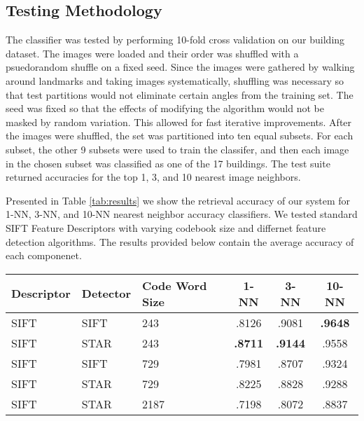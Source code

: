 \subsection{Testing Methodology}

The classifier was tested by performing 10-fold cross validation on our building dataset. 
The images were loaded and their order was shuffled with a psuedorandom shuffle on a fixed seed. 
Since the images were gathered by walking around landmarks and taking images systematically, shuffling was necessary so that test partitions would not eliminate certain angles from the training set. 
The seed was fixed so that the effects of modifying the algorithm would not be masked by random variation. This allowed for fast iterative improvements. After the images were shuffled, the set was partitioned into ten equal subsets. 
For each subset, the other 9 subsets were used to train the classifer, and then each image in the chosen subset was classified as one of the 17 buildings. 
The test suite returned accuracies for the top 1, 3, and 10 nearest image neighbors.


Presented in Table \ref{tab:results} we show the retrieval accuracy of our system for 1-NN, 3-NN, and 10-NN nearest neighbor accuracy classifiers.
We tested standard SIFT Feature Descriptors with varying codebook size and differnet feature detection algorithms.
The results provided below contain the average accuracy of each componenet.

\begin{table*}[ht!]
\label{tab:results}
\centering
\begin{tabular}{| l | l | l | c | c | c |}
\hline
Descriptor & Detector & Code Word Size & 1-NN & 3-NN & 10-NN\\ \hline
SIFT & SIFT & 243 & .8126 & .9081  & \textbf{.9648}  \\ 
SIFT & STAR & 243 & \textbf{.8711} & \textbf{.9144} & .9558 \\ 
SIFT & SIFT & 729 & .7981 & .8707 & .9324 \\ 
SIFT & STAR & 729 & .8225 & .8828 & .9288 \\ 
SIFT & STAR & 2187 & .7198 & .8072 & .8837\\ \hline
\end{tabular}
\vspace*{10pt}
\caption{Retrieval Accuracy}
\end{table*}


